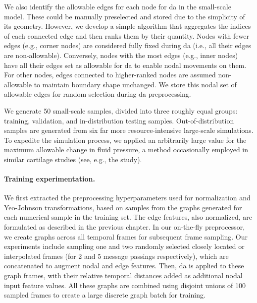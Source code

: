 We also identify the allowable edges for each node for \ac{da} in the small-scale model. These could be manually preselected and stored due to the simplicity of its geometry. However, we develop a simple algorithm that aggregates the indices of each connected edge and then ranks them by their quantity. Nodes with fewer edges (e.g., corner nodes) are considered fully fixed during \ac{da} (i.e., all their edges are non-allowable). Conversely, nodes with the most edges (e.g., inner nodes) have all their edges set as allowable for \ac{da} to enable nodal movements on them. For other nodes, edges connected to higher-ranked nodes are assumed non-allowable to maintain boundary shape unchanged. We store this nodal set of allowable edges for random selection during \ac{da} preprocessing.

We generate 50 small-scale samples, divided into three roughly equal groups: training, validation, and in-distribution testing samples. Out-of-distribution samples are generated from six far more resource-intensive large-scale simulations. To expedite the simulation process, we applied an arbitrarily large value for the maximum allowable change in fluid pressure, a method occasionally employed in similar cartilage studies (see, e.g., the \cite{mononen2023} study).

\paragraph{Training experimentation.} We first extracted the preprocessing hyperparameters used for normalization and Yeo-Johnson transformations, based on samples from the graphs generated for each numerical sample in the training set. The edge features, also normalized, are formulated as described in the previous chapter. In our on-the-fly preprocessor, we create graphs across all temporal frames for subsequent frame sampling. Our experiments include sampling one and two randomly selected closely located or interpolated frames (for 2 and 5 message passings respectively), which are concatenated to augment nodal and edge features. Then, \ac{da} is applied to these graph frames, with their relative temporal distances added as additional nodal input feature values. All these graphs are combined using disjoint unions of 100 sampled frames to create a large discrete graph batch for training.

